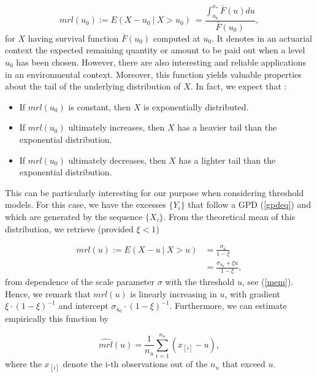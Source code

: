 \begin{equation}
mrl(u_0)
:=E(X-u_0\ |\ X>u_0) 
\ = \frac{\int_{u_0}^{x_*} \bar{F}(u)du}{\bar{F}(u_0)},
\end{equation}
for $X$ having survival function $\bar{F}(u_0)$ computed at $u_0$.
It denotes in an actuarial context
the expected remaining quantity or amount to be paid out when a level $u_0$ has been chosen. However, there are also interesting and reliable applications in an environmental context.
Moreover, this function yields valuable properties about the tail of the underlying distribution of $X$. In fact, we expect that :

\begin{itemize}
	\item If $mrl(u_0)$ is constant, then $X$ is exponentially distributed.
	\item If $mrl(u_0)$ ultimately increases, then $X$ has a heavier tail than the exponential distribution.
	\item If $mrl(u_0)$ ultimately decreases, then $X$ has a lighter tail than the exponential distribution.
\end{itemize}
This can be particularly interesting for our purpose when considering threshold models. For this case, we have the excesses $\{Y_i\}$ that follow a GPD (\ref{gpdeq}) and which are generated by the sequence $\{X_i\}$. From the theoretical mean of this distribution, we retrieve  (provided $\xi<1$)

\begin{equation} \label{mrl}
\begin{aligned}
mrl(u):=E(X-u\ |\ X>u)
& = \frac{\sigma_u}{1-\xi} \\
& = \frac{\sigma_{u_0}+\xi u}{1-\xi},
\end{aligned}
\end{equation}
from dependence of the scale parameter $\sigma$ with the threshold $u$, see (\ref{mem}). Hence, we remark that $mrl(u)$ is linearly increasing in $u$, with gradient $\xi\cdot(1-\xi)^{-1}$ and intercept $\sigma_{u_0}\cdot (1-\xi)^{-1}$. Furthermore, we can estimate empirically this function by 

\begin{equation}\label{mrle}
\widehat{mrl}(u)=\frac{1}{n_u}\sum_{i=1}^{n_u}(x_{[i]}-u),
\end{equation}
where the $x_{[i]}$ denote the i-th observations out of the $n_u$ that exceed $u$.

